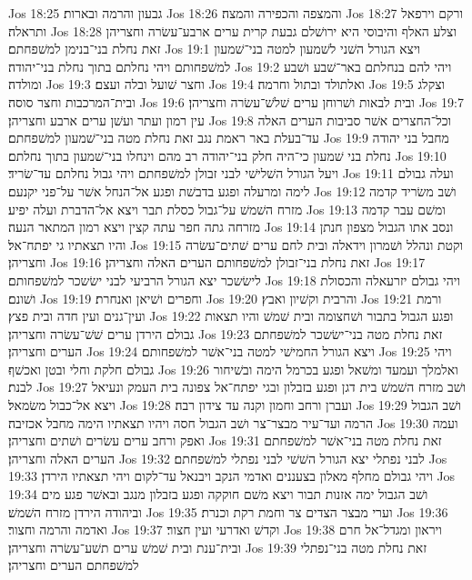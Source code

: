 Jos 18:25  גבעון והרמה ובארות׃
Jos 18:26  והמצפה והכפירה והמצה׃
Jos 18:27  ורקם וירפאל ותראלה׃
Jos 18:28  וצלע האלף והיבוסי היא ירושׁלם גבעת קרית ערים ארבע־עשׂרה וחצריהן זאת נחלת בני־בנימן למשׁפחתם׃
Jos 19:1  ויצא הגורל השׁני לשׁמעון למטה בני־שׁמעון למשׁפחותם ויהי נחלתם בתוך נחלת בני־יהודה׃
Jos 19:2  ויהי להם בנחלתם באר־שׁבע ושׁבע ומולדה׃
Jos 19:3  וחצר שׁועל ובלה ועצם׃
Jos 19:4  ואלתולד ובתול וחרמה׃
Jos 19:5  וצקלג ובית־המרכבות וחצר סוסה׃
Jos 19:6  ובית לבאות ושׁרוחן ערים שׁלשׁ־עשׂרה וחצריהן׃
Jos 19:7  עין רמון ועתר ועשׁן ערים ארבע וחצריהן׃
Jos 19:8  וכל־החצרים אשׁר סביבות הערים האלה עד־בעלת באר ראמת נגב זאת נחלת מטה בני־שׁמעון למשׁפחתם׃
Jos 19:9  מחבל בני יהודה נחלת בני שׁמעון כי־היה חלק בני־יהודה רב מהם וינחלו בני־שׁמעון בתוך נחלתם׃
Jos 19:10  ויעל הגורל השׁלישׁי לבני זבולן למשׁפחתם ויהי גבול נחלתם עד־שׂריד׃
Jos 19:11  ועלה גבולם לימה ומרעלה ופגע בדבשׁת ופגע אל־הנחל אשׁר על־פני יקנעם׃
Jos 19:12  ושׁב משׂריד קדמה מזרח השׁמשׁ על־גבול כסלת תבר ויצא אל־הדברת ועלה יפיע׃
Jos 19:13  ומשׁם עבר קדמה מזרחה גתה חפר עתה קצין ויצא רמון המתאר הנעה׃
Jos 19:14  ונסב אתו הגבול מצפון חנתן והיו תצאתיו גי יפתח־אל׃
Jos 19:15  וקטת ונהלל ושׁמרון וידאלה ובית לחם ערים שׁתים־עשׂרה וחצריהן׃
Jos 19:16  זאת נחלת בני־זבולן למשׁפחותם הערים האלה וחצריהן׃
Jos 19:17  לישׂשכר יצא הגורל הרביעי לבני ישׂשכר למשׁפחותם׃
Jos 19:18  ויהי גבולם יזרעאלה והכסולת ושׁונם׃
Jos 19:19  וחפרים ושׁיאן ואנחרת׃
Jos 19:20  והרבית וקשׁיון ואבץ׃
Jos 19:21  ורמת ועין־גנים ועין חדה ובית פצץ׃
Jos 19:22  ופגע הגבול בתבור ושׁחצומה ובית שׁמשׁ והיו תצאות גבולם הירדן ערים שׁשׁ־עשׂרה וחצריהן׃
Jos 19:23  זאת נחלת מטה בני־ישׂשכר למשׁפחתם הערים וחצריהן׃
Jos 19:24  ויצא הגורל החמישׁי למטה בני־אשׁר למשׁפחותם׃
Jos 19:25  ויהי גבולם חלקת וחלי ובטן ואכשׁף׃
Jos 19:26  ואלמלך ועמעד ומשׁאל ופגע בכרמל הימה ובשׁיחור לבנת׃
Jos 19:27  ושׁב מזרח השׁמשׁ בית דגן ופגע בזבלון ובגי יפתח־אל צפונה בית העמק ונעיאל ויצא אל־כבול משׂמאל׃
Jos 19:28  ועברן ורחב וחמון וקנה עד צידון רבה׃
Jos 19:29  ושׁב הגבול הרמה ועד־עיר מבצר־צר ושׁב הגבול חסה ויהיו תצאתיו הימה מחבל אכזיבה׃
Jos 19:30  ועמה ואפק ורחב ערים עשׂרים ושׁתים וחצריהן׃
Jos 19:31  זאת נחלת מטה בני־אשׁר למשׁפחתם הערים האלה וחצריהן׃
Jos 19:32  לבני נפתלי יצא הגורל השׁשׁי לבני נפתלי למשׁפחתם׃
Jos 19:33  ויהי גבולם מחלף מאלון בצעננים ואדמי הנקב ויבנאל עד־לקום ויהי תצאתיו הירדן׃
Jos 19:34  ושׁב הגבול ימה אזנות תבור ויצא משׁם חוקקה ופגע בזבלון מנגב ובאשׁר פגע מים וביהודה הירדן מזרח השׁמשׁ׃
Jos 19:35  וערי מבצר הצדים צר וחמת רקת וכנרת׃
Jos 19:36  ואדמה והרמה וחצור׃
Jos 19:37  וקדשׁ ואדרעי ועין חצור׃
Jos 19:38  ויראון ומגדל־אל חרם ובית־ענת ובית שׁמשׁ ערים תשׁע־עשׂרה וחצריהן׃
Jos 19:39  זאת נחלת מטה בני־נפתלי למשׁפחתם הערים וחצריהן׃
